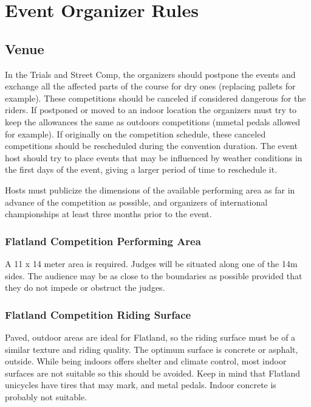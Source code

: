 \chapter{Event Organizer Rules}

\section{Venue}

In the Trials and Street Comp, the organizers should postpone the events and exchange all the affected parts of the course for dry ones (replacing pallets for example).
These competitions should be canceled if considered dangerous for the riders.
If postponed or moved to an indoor location the organizers must try to keep the allowances the same as outdoors competitions (mmetal pedals allowed for example).
If originally on the competition schedule, these canceled competitions should be rescheduled during the convention duration.
The event host should try to place events that may be influenced by weather conditions in the first days of the event, giving a larger period of time to reschedule it.

Hosts must publicize the dimensions of the available performing area as far in advance of the competition as possible, and organizers of international championships at least three months prior to the event.

\subsection{Flatland Competition Performing Area \label{sec:flat-street_flatland-performing-area}}
A 11 x 14 meter area is required.
Judges will be situated along one of the 14m sides.
The audience may be as close to the boundaries as possible provided that they do not impede or obstruct the judges.

\subsection{Flatland Competition Riding Surface}
Paved, outdoor areas are ideal for Flatland, so the riding surface must be of a similar texture and riding quality.
The optimum surface is concrete or asphalt, outside.
While being indoors offers shelter and climate control, most indoor surfaces are not suitable so this should be avoided.
Keep in mind that Flatland unicycles have tires that may mark, and metal pedals. Indoor concrete is probably not suitable.

